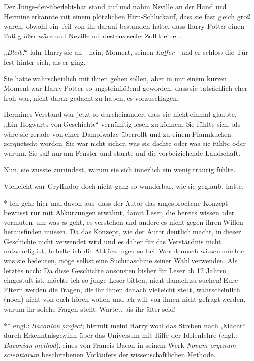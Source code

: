 {Der Junge-der-überlebt-hat stand auf und nahm Neville an der Hand und Hermine erkannte mit einem plötzlichen Hirn-Schluckauf, dass sie fast gleich groß waren, obwohl ein Teil von ihr darauf bestanden hatte, dass Harry Potter einen Fuß größer wäre und Neville mindestens sechs Zoll kleiner.

„\emph{Bleib!}“ fuhr Harry sie an—nein, Moment, seinen \emph{Koffer}—und er schloss die Tür fest hinter sich, als er ging.

Sie hätte wahrscheinlich mit ihnen gehen sollen, aber in nur einem kurzen Moment war Harry Potter so angsteinflößend geworden, dass sie tatsächlich eher froh war, nicht daran gedacht zu haben, es vorzuschlagen.

Hermines Verstand war jetzt so durcheinander, dass sie nicht einmal glaubte, „Ein Hogwarts von Geschichte“ vernünftig lesen zu können. Sie fühlte sich, als wäre sie gerade von einer Dampfwalze überrollt und zu einem Pfannkuchen zerquetscht worden. Sie war nicht sicher, was sie dachte oder was sie fühlte oder warum. Sie saß nur am Fenster und starrte auf die vorbeiziehende Landschaft.

Nun, sie wusste zumindest, warum sie sich innerlich ein wenig traurig fühlte.

Vielleicht war Gryffindor doch nicht ganz so wunderbar, wie sie geglaubt hatte.

* Ich gehe hier mal davon aus, dass der Autor das angesprochene Konzept bewusst nur mit Abkürzungen erwähnt, damit Leser, die bereits wissen oder vermuten, um was es geht, es verstehen und andere es nicht gegen ihren Willen herausfinden müssen. Da das Konzept, wie der Autor deutlich macht, in dieser Geschichte \uline{nicht} verwendet wird und es daher für das Verständnis nicht notwendig ist, behalte ich die Abkürzungen so bei. Wer dennoch wissen möchte, was sie bedeuten, möge selbst eine Suchmaschine seiner Wahl verwenden. Als letztes noch: Da diese Geschichte ansonsten bisher für Leser ab 12 Jahren eingestuft ist, möchte ich so junge Leser bitten, nicht danach zu suchen! Eure Eltern werden die Fragen, die ihr ihnen danach vielleicht stellt, wahrscheinlich (noch) nicht von euch hören wollen und ich will von ihnen nicht gefragt werden, warum ihr solche Fragen stellt. Wartet, bis ihr älter seid!

** engl.: \emph{Baconian project;} hiermit meint Harry wohl das Streben nach „Macht“ durch Erkenntnisgewinn über das Universum mit Hilfe der Idolenlehre (engl.: \emph{Baconian method}), eines von Francis Bacon in seinem Werk \emph{Novum organum scientiarum} beschriebenen Vorläufers der wissenschaftlichen Methode.

}
